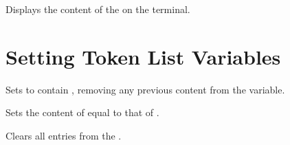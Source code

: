 \documentclass[oneside]{book}
\let\tn=\cs
\begin{document}
\begin{function}{\TlVarShow}
\begin{syntax}
 
\end{syntax}
Displays the content of the  on the terminal.
\begin{codehigh}
\TlSet {}
\TlVarShow \lTmpaTl
\end{codehigh}
\end{function}

\section{Setting Token List Variables}

\begin{function}{\TlSet}
\begin{syntax}
  
\end{syntax}
Sets  to contain ,
removing any previous content from the variable.
\begin{demohigh}
\TlSet {}
\TlUse \lTmpiTl
\end{demohigh}
\end{function}

\begin{function}{\TlSetEq}
\begin{syntax}
  
\end{syntax}
Sets the content of  equal to that of .
\begin{demohigh}
\TlSet {}
\TlSetEq \lTmpbTl \lTmpaTl
\TlUse \lTmpbTl
\end{demohigh}
\end{function}

\begin{function}{\TlClear}
\begin{syntax}
 
\end{syntax}
Clears all entries from the .
\begin{demohigh}
\TlSet {}
\TlClear \lTmpjTl
\TlSet {}
\TlUse \lTmpjTl
\end{demohigh}
\end{function}
\end{document}
